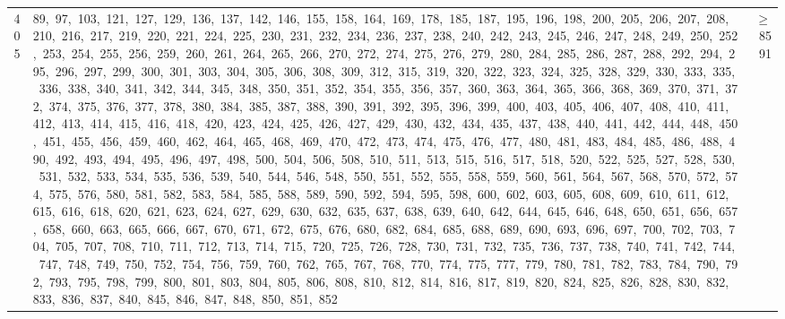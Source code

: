 \begin{longtable}{c|p{}|r}
405 & 89,\ 97,\ 103,\ 121,\ 127,\ 129,\ 136,\ 137,\ 142,\ 146,\ 155,\ 158,\ 164,\ 169,\ 178,\ 185,\ 187,\ 195,\ 196,\ 198,\ 200,\ 205,\ 206,\ 207,\ 208,\ 210,\ 216,\ 217,\ 219,\ 220,\ 221,\ 224,\ 225,\ 230,\ 231,\ 232,\ 234,\ 236,\ 237,\ 238,\ 240,\ 242,\ 243,\ 245,\ 246,\ 247,\ 248,\ 249,\ 250,\ 252,\ 253,\ 254,\ 255,\ 256,\ 259,\ 260,\ 261,\ 264,\ 265,\ 266,\ 270,\ 272,\ 274,\ 275,\ 276,\ 279,\ 280,\ 284,\ 285,\ 286,\ 287,\ 288,\ 292,\ 294,\ 295,\ 296,\ 297,\ 299,\ 300,\ 301,\ 303,\ 304,\ 305,\ 306,\ 308,\ 309,\ 312,\ 315,\ 319,\ 320,\ 322,\ 323,\ 324,\ 325,\ 328,\ 329,\ 330,\ 333,\ 335,\ 336,\ 338,\ 340,\ 341,\ 342,\ 344,\ 345,\ 348,\ 350,\ 351,\ 352,\ 354,\ 355,\ 356,\ 357,\ 360,\ 363,\ 364,\ 365,\ 366,\ 368,\ 369,\ 370,\ 371,\ 372,\ 374,\ 375,\ 376,\ 377,\ 378,\ 380,\ 384,\ 385,\ 387,\ 388,\ 390,\ 391,\ 392,\ 395,\ 396,\ 399,\ 400,\ 403,\ 405,\ 406,\ 407,\ 408,\ 410,\ 411,\ 412,\ 413,\ 414,\ 415,\ 416,\ 418,\ 420,\ 423,\ 424,\ 425,\ 426,\ 427,\ 429,\ 430,\ 432,\ 434,\ 435,\ 437,\ 438,\ 440,\ 441,\ 442,\ 444,\ 448,\ 450,\ 451,\ 455,\ 456,\ 459,\ 460,\ 462,\ 464,\ 465,\ 468,\ 469,\ 470,\ 472,\ 473,\ 474,\ 475,\ 476,\ 477,\ 480,\ 481,\ 483,\ 484,\ 485,\ 486,\ 488,\ 490,\ 492,\ 493,\ 494,\ 495,\ 496,\ 497,\ 498,\ 500,\ 504,\ 506,\ 508,\ 510,\ 511,\ 513,\ 515,\ 516,\ 517,\ 518,\ 520,\ 522,\ 525,\ 527,\ 528,\ 530,\ 531,\ 532,\ 533,\ 534,\ 535,\ 536,\ 539,\ 540,\ 544,\ 546,\ 548,\ 550,\ 551,\ 552,\ 555,\ 558,\ 559,\ 560,\ 561,\ 564,\ 567,\ 568,\ 570,\ 572,\ 574,\ 575,\ 576,\ 580,\ 581,\ 582,\ 583,\ 584,\ 585,\ 588,\ 589,\ 590,\ 592,\ 594,\ 595,\ 598,\ 600,\ 602,\ 603,\ 605,\ 608,\ 609,\ 610,\ 611,\ 612,\ 615,\ 616,\ 618,\ 620,\ 621,\ 623,\ 624,\ 627,\ 629,\ 630,\ 632,\ 635,\ 637,\ 638,\ 639,\ 640,\ 642,\ 644,\ 645,\ 646,\ 648,\ 650,\ 651,\ 656,\ 657,\ 658,\ 660,\ 663,\ 665,\ 666,\ 667,\ 670,\ 671,\ 672,\ 675,\ 676,\ 680,\ 682,\ 684,\ 685,\ 688,\ 689,\ 690,\ 693,\ 696,\ 697,\ 700,\ 702,\ 703,\ 704,\ 705,\ 707,\ 708,\ 710,\ 711,\ 712,\ 713,\ 714,\ 715,\ 720,\ 725,\ 726,\ 728,\ 730,\ 731,\ 732,\ 735,\ 736,\ 737,\ 738,\ 740,\ 741,\ 742,\ 744,\ 747,\ 748,\ 749,\ 750,\ 752,\ 754,\ 756,\ 759,\ 760,\ 762,\ 765,\ 767,\ 768,\ 770,\ 774,\ 775,\ 777,\ 779,\ 780,\ 781,\ 782,\ 783,\ 784,\ 790,\ 792,\ 793,\ 795,\ 798,\ 799,\ 800,\ 801,\ 803,\ 804,\ 805,\ 806,\ 808,\ 810,\ 812,\ 814,\ 816,\ 817,\ 819,\ 820,\ 824,\ 825,\ 826,\ 828,\ 830,\ 832,\ 833,\ 836,\ 837,\ 840,\ 845,\ 846,\ 847,\ 848,\ 850,\ 851,\ 852 & $\ge$ 8591 \\

\end{longtable}
